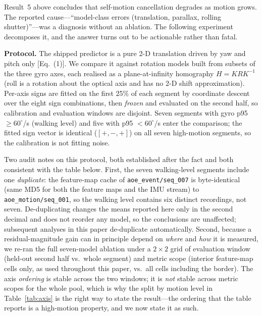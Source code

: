 \documentclass[12pt,a4paper]{article}
\begin{document}
Result~5 above concludes that self-motion cancellation degrades as motion grows. The reported cause---``model-class errors (translation, parallax, rolling shutter)''---was a diagnosis without an ablation. The following experiment decomposes it, and the answer turns out to be actionable rather than fatal.

\textbf{Protocol.} The shipped predictor is a pure 2-D translation driven by yaw and pitch only [Eq.~(1)]. We compare it against rotation models built from subsets of the three gyro axes, each realised as a plane-at-infinity homography $H = K R K^{-1}$ (roll is a rotation about the optical axis and has no 2-D shift approximation). Per-axis signs are fitted on the first 25\% of each segment by coordinate descent over the eight sign combinations, then \emph{frozen} and evaluated on the second half, so calibration and evaluation windows are disjoint. Seven segments with gyro p95 $\ge 60^\circ$/s (walking level) and five with p95 $<60^\circ$/s enter the comparison; the fitted sign vector is identical ($[+,-,+]$) on all seven high-motion segments, so the calibration is not fitting noise.

Two audit notes on this protocol, both established after the fact and both consistent with the table below. First, the seven walking-level segments include one \emph{duplicate}: the feature-map cache of \texttt{aoe\_event/seq\_007} is byte-identical (same MD5 for both the feature maps and the IMU stream) to \texttt{aoe\_motion/seq\_001}, so the walking level contains six distinct recordings, not seven. De-duplicating changes the means reported here only in the second decimal and does not reorder any model, so the conclusions are unaffected; subsequent analyses in this paper de-duplicate automatically. Second, because a residual-magnitude gain can in principle depend on \emph{where} and \emph{how} it is measured, we re-ran the full seven-model ablation under a $2\times2$ grid of evaluation window (held-out second half vs.\ whole segment) and metric scope (interior feature-map cells only, as used throughout this paper, vs.\ all cells including the border). The axis \emph{ordering} is stable across the two windows; it is \emph{not} stable across metric scopes for the whole pool, which is why the split by motion level in Table~\ref{tab:axis} is the right way to state the result---the ordering that the table reports is a high-motion property, and we now state it as such.
\end{document}
